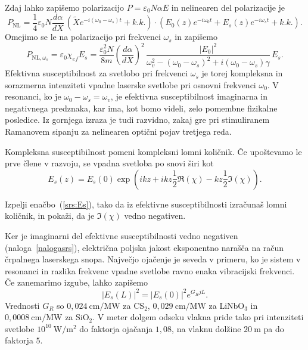 Zdaj lahko zapišemo polarizacijo $P = \varepsilon_0N\alpha E$ in nelinearen del
polarizacije je
\begin{equation}
P_{\mathrm{NL}} = \frac{1}{4}\varepsilon_0 N \frac{d\alpha}{dX} \, \left(\tilde{X}
e^{-i(\omega_0-\omega_s)t}
+ k.k.\right) \cdot \left( E_0(z)e^{-i\omega_0t}+ E_s(z)e^{-i\omega_st} + k.k.\right).
\end{equation}
Omejimo se le na polarizacijo pri frekvenci $\omega_s$ in zapišemo
\begin{equation}
P_{\mathrm{NL},\omega_s} = \varepsilon_0 \chi_{ef}E_s = 
\frac{\varepsilon_0^2 N }{8m}\left(\frac{d\alpha}{dX}\right)^2 \, 
\frac{|E_0|^2}{\omega_v^2-(\omega_0-\omega_s)^2+i(\omega_0-\omega_s)\gamma}\,E_s.
\label{srs:chi}
\end{equation}
Efektivna susceptibilnost za svetlobo pri frekvenci $\omega_s$ 
je  torej kompleksna in sorazmerna intenziteti 
vpadne laserske svetlobe pri osnovni frekvenci $\omega_0$. 
V resonanci, ko je $\omega_0-\omega_s = \omega_v$, je efektivna susceptibilnost
imaginarna in negativnega predznaka, kar ima, kot bomo videli, zelo pomembne 
fizikalne posledice. Iz gornjega izraza je tudi razvidno, zakaj gre pri 
stimuliranem Ramanovem sipanju za nelinearen optični pojav tretjega reda. 

Kompleksna susceptibilnost pomeni kompleksni lomni količnik. Če upoštevamo
le prve člene v razvoju, se vpadna svetloba po snovi širi kot
\begin{equation}
E_s(z) = E_s(0)\exp\left(i k z + ikz\frac{1}{2}\Re(\chi)- k z \frac{1}{2}\Im(\chi)\right).
\label{srs:Es}
\end{equation}
\begin{definition}
\label{nalogasrs}
 Izpelji enačbo~(\ref{srs:Es}), tako da iz efektivne susceptibilnosti izračunaš lomni količnik,
in pokaži, da je $\Im(\chi)$ vedno negativen. 
\end{definition}
Ker je imaginarni del efektivne susceptibilnosti vedno negativen (naloga~\ref{nalogasrs}), 
električna poljska jakost eksponentno narašča na račun črpalnega laserskega snopa. 
Največjo ojačenje je seveda v primeru, ko je sistem v resonanci
in razlika frekvenc vpadne svetlobe ravno enaka vibracijski frekvenci.
Če zanemarimo izgube, lahko zapišemo
\begin{equation}
|E_s(L)|^2 = |E_s(0)|^2 e^{G_RjL}.
\end{equation}
Vrednosti $G_R$ so $0,024~\si{\cm/\mega\watt}$ za CS$_2$, 
$0,029~\si{\cm/\mega\watt}$ za LiNbO$_3$ 
in $0,0008~\si{\cm/\mega\watt}$ za SiO$_2$. 
V meter dolgem odseku vlakna pride tako pri intenziteti svetlobe $10^{10}~\si{\watt/\meter^2}$ 
do faktorja ojačanja $1,08$, na vlaknu dolžine $20~\si{\metre}$ pa do faktorja $5$.

